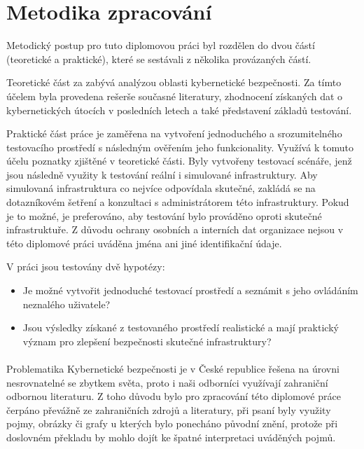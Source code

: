 \section{Metodika zpracování}\label{sec:metodika-zpracovani}
Metodický postup pro tuto diplomovou práci byl rozdělen do dvou částí (teoretické a praktické), které se sestávali z několika
provázaných částí.

Teoretické část za zabývá analýzou oblasti kybernetické bezpečnosti.
Za tímto účelem byla provedena rešerše současné literatury, zhodnocení získaných dat o kybernetických útocích v posledních letech a také představení základů testování.

Praktické část práce je zaměřena na vytvoření jednoduchého a srozumitelného testovacího prostředí s následným ověřením jeho funkcionality.
Využívá k tomuto účelu poznatky zjištěné v teoretické části.
Byly vytvořeny testovací scénáře, jenž jsou následně využity k testování reální i simulované infrastruktury.
Aby simulovaná infrastruktura co nejvíce odpovídala skutečné, zakládá se na dotazníkovém šetření a konzultaci s administrátorem této infrastruktury.
Pokud je to možné, je preferováno, aby testování bylo prováděno oproti skutečné infrastruktuře.
Z důvodu ochrany osobních a interních dat organizace nejsou v této diplomové práci uváděna jména ani jiné identifikační údaje.

V práci jsou testovány dvě hypotézy:

\begin{itemize}
	\item Je možné vytvořit jednoduché testovací prostředí a seznámit s jeho ovládáním neznalého uživatele?
	\item Jsou výsledky získané z testovaného prostředí realistické a mají praktický význam pro zlepšení bezpečnosti skutečné infrastruktury?
\end{itemize}

\paragraph{}
Problematika Kybernetické bezpečnosti je v České republice řešena na úrovni nesrovnatelné se zbytkem světa, proto i naši odborníci využívají zahraniční odbornou literaturu.
Z toho důvodu bylo pro zpracování této diplomové práce čerpáno převážně ze zahraničních zdrojů a literatury, při psaní byly využity pojmy, obrázky či grafy u kterých
bylo ponecháno původní znění, protože při doslovném překladu by mohlo dojít ke špatné interpretaci uváděných pojmů.


